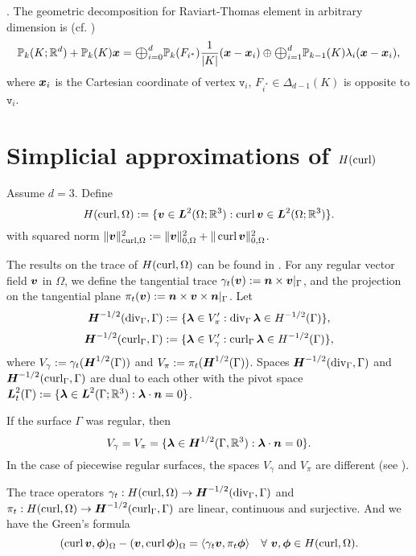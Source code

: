 .
The geometric decomposition for Raviart-Thomas element in arbitrary dimension is (cf. \cite{ArnoldFalkWinther2009})
$$
\mathbb P_k(K;\mathbb R^d)+\mathbb P_k(K)\bs x=\Oplus_{i=0}^d\mathbb P_{k}(F_{i^*})\frac{1}{|K|}(\bs x-\bs x_i) \oplus \Oplus_{i=1}^d\mathbb P_{k-1}(K)\lambda_i(\bs x-\bs x_i),
$$
where $\boldsymbol x_i$ is the Cartesian coordinate of vertex $\texttt{v}_i$, $F_{i^*}\in\Delta_{d-1}(K)$ is opposite to $\texttt{v}_i$.



\section{Simplicial approximations of $H(\operatorname{curl})$}

Assume $d=3$.
Define
\[
H(\operatorname{curl},\Omega):=\{\boldsymbol v\in \boldsymbol L^2(\Omega;\mathbb R^3): \operatorname{curl}\boldsymbol v\in \boldsymbol L^2(\Omega;\mathbb R^3)\}.
\]
with squared  norm $\|\boldsymbol v\|_{\operatorname{curl}, \Omega}^2:=\|\boldsymbol v\|_{0, \Omega}^2+\|\operatorname{curl}\boldsymbol v\|_{0, \Omega}^2$.

The results on the trace of $H(\operatorname{curl},\Omega)$ can be found in \cite{BuffaCostabelSheen2002,BuffaCiarlet2001,BuffaCiarlet2001a}.
 For any regular vector field $\boldsymbol v$ in $\Omega$, we define the tangential trace $\gamma_{t}(\boldsymbol v):=\boldsymbol n\times \boldsymbol v|_{\Gamma}$, and the projection on the tangential plane $\pi_{t}(\boldsymbol v):=\boldsymbol n\times\boldsymbol v\times  \boldsymbol n|_{\Gamma}$. Let
 \[
 \boldsymbol H^{-1/2}(\operatorname{div}_{\Gamma}, \Gamma):=\{\boldsymbol\lambda\in V_{\pi}': \operatorname{div}_{\Gamma}\boldsymbol\lambda\in H^{-1/2}(\Gamma)\},
 \]
 \[
 \boldsymbol H^{-1/2}(\operatorname{curl}_{\Gamma}, \Gamma):=\{\boldsymbol\lambda\in V_{\gamma}': \operatorname{curl}_{\Gamma}\boldsymbol\lambda\in H^{-1/2}(\Gamma)\},
 \]
 where $V_{\gamma}:=\gamma_{t}(\boldsymbol H^{1/2}(\Gamma))$ and $V_{\pi}:=\pi_{t}(\boldsymbol H^{1/2}(\Gamma))$.
Spaces $ \boldsymbol H^{-1/2}(\operatorname{div}_{\Gamma}, \Gamma)$ and $ \boldsymbol H^{-1/2}(\operatorname{curl}_{\Gamma}, \Gamma)$ are dual to each other with the pivot space $\boldsymbol L_t^2(\Gamma):=\{\boldsymbol \lambda\in\boldsymbol L^2(\Gamma;\mathbb R^3): \boldsymbol \lambda\cdot\boldsymbol n=0\}$.

If the surface $\Gamma$ was regular, then
\[
V_{\gamma}=V_{\pi}=\{\boldsymbol\lambda\in\boldsymbol H^{1/2}(\Gamma, \mathbb R^3): \boldsymbol\lambda\cdot\boldsymbol n=0\}.
\]
In the case of piecewise regular surfaces, the spaces $V_{\gamma}$ and $V_{\pi}$ are different (see \cite{BuffaCiarlet2001}).

\begin{lemma}
The trace operators $\gamma_{t}:  H(\operatorname{curl},\Omega)\to\boldsymbol H^{-1/2}(\operatorname{div}_{\Gamma}, \Gamma)$ and $\pi_{t}:  H(\operatorname{curl},\Omega)\to\boldsymbol H^{-1/2}(\operatorname{curl}_{\Gamma}, \Gamma)$ are linear, continuous and surjective. And we have the 
Green's formula
\[
(\operatorname{curl}\boldsymbol v, \boldsymbol\phi)_{\Omega} - (\boldsymbol v, \operatorname{curl}\boldsymbol\phi)_{\Omega}=\langle\gamma_t\boldsymbol v, \pi_t\boldsymbol \phi\rangle\quad\forall~\boldsymbol v, \boldsymbol \phi\in H(\operatorname{curl},\Omega).
\]
\end{lemma}


